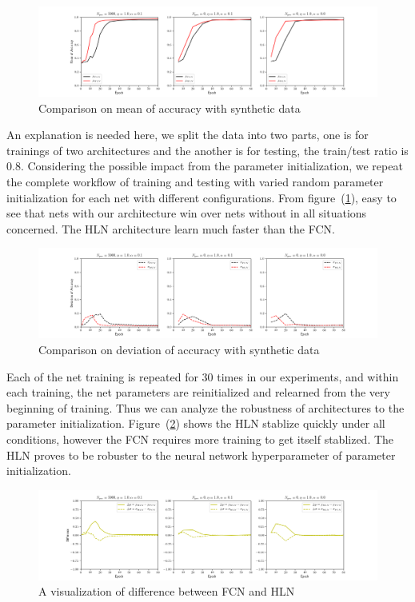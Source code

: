 \documentclass[3p,times,procedia]{elsarticle}
\begin{document}
\begin{figure}[h]
	\centerline{
		\includegraphics[width=7in]{mean_accuracy}}
	\caption{
		Comparison on mean of 
		accuracy with synthetic data}
	\label{fig:2}
\end{figure}

An explanation is needed here,
we split the data into two parts, one
is for trainings of two
architectures and the another is for
testing, the train/test ratio is 0.8.
Considering the possible impact from
the parameter initialization, 
we repeat the complete workflow
of training and testing with varied
random parameter initialization
for each net with different 
configurations.
From figure~(\ref{fig:2}), easy
to see that nets with our architecture
win over nets without in all situations
concerned.
The HLN architecture learn much faster
than the FCN.

\begin{figure}[h]
	\centerline{
		\includegraphics[width=7in]{devi_accuracy}}
	\caption{
		Comparison on deviation of 
		accuracy with synthetic data}
	\label{fig:3}
\end{figure}

Each of the net training is repeated for 
30 times in our experiments, and within
each training, the net parameters are
reinitialized and relearned from the
very beginning of training. Thus we
can analyze the robustness of 
architectures to the parameter
initialization.
Figure~(\ref{fig:3}) shows the HLN
stablize quickly under all conditions,
however the FCN requires more training
to get itself stablized. The HLN proves
to be robuster to the neural network
hyperparameter of parameter
initialization.



\begin{figure}[h]
	\centerline{\includegraphics[width=7in]{delta_accuracy}}
	\caption{A visualization of
	difference between FCN and HLN}
	\label{fig:4}
\end{figure}
\end{document}

